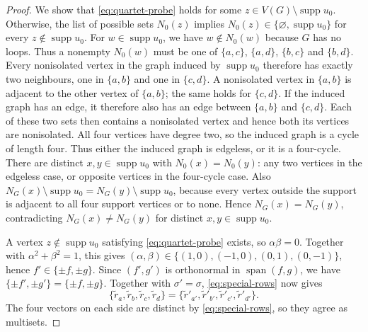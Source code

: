 \documentclass[11pt,a4paper]{article}
\theoremstyle{plain}
\theoremstyle{definition}
\DeclareMathOperator{\supp}{supp}
\DeclareMathOperator{\spn}{span}
\begin{document}
\begin{proof}
  We show that \cref{eq:quartet-probe} holds for some
  $z\in V(G)\setminus\supp u_0$. Otherwise, the list of
  possible sets $N_0(z)$ implies
  $N_0(z)\in\{\varnothing,\supp u_0\}$ for every
  $z\notin\supp u_0$.
  For $w\in\supp u_0$, we have $w\notin N_0(w)$ because $G$ has no loops.
  Thus a nonempty $N_0(w)$ must be one of
  $\{a,c\}$, $\{a,d\}$, $\{b,c\}$ and $\{b,d\}$.
  Every nonisolated vertex in the graph induced by $\supp u_0$
  therefore has exactly two neighbours, one in $\{a,b\}$ and one in
  $\{c,d\}$. A nonisolated vertex in $\{a,b\}$ is adjacent to the
  other vertex of $\{a,b\}$; the same holds for $\{c,d\}$.
  If the induced graph has an edge, it therefore also has an edge
  between $\{a,b\}$ and $\{c,d\}$.
  Each of these two sets then contains a nonisolated vertex and hence
  both its vertices are nonisolated. All four vertices have degree two,
  so the induced graph is a cycle of length four.
  Thus either the induced graph is edgeless, or it is a four-cycle.
  There are distinct $x,y\in\supp u_0$ with $N_0(x)=N_0(y)$:
  any two vertices in the edgeless case, or opposite vertices in the
  four-cycle case. Also
  $N_G(x)\setminus\supp u_0=N_G(y)\setminus\supp u_0$, because every
  vertex outside the support is adjacent to all four support vertices
  or to none. Hence $N_G(x)=N_G(y)$, contradicting
  $N_G(x)\ne N_G(y)$ for distinct $x,y\in\supp u_0$.

  A vertex $z\notin\supp u_0$ satisfying \cref{eq:quartet-probe}
  exists, so $\alpha\beta=0$. Together with $\alpha^2+\beta^2=1$,
  this gives $(\alpha,\beta)\in\{(1,0),(-1,0),(0,1),(0,-1)\}$,
  hence $f'\in\{\pm f,\pm g\}$. Since $(f',g')$ is orthonormal in
  $\spn(f,g)$, we have $\{\pm f',\pm g'\}=\{\pm f,\pm g\}$.
  Together with $\sigma'=\sigma$, \cref{eq:special-rows} now gives
  \begin{equation}\label{eq:quartet-row-equality}
    \{\tilde{r}_a,\tilde{r}_b,\tilde{r}_c,\tilde{r}_d\}
    =\{\tilde{r}'_{a'},\tilde{r}'_{b'},\tilde{r}'_{c'},\tilde{r}'_{d'}\}.
  \end{equation}
  The four vectors on each side are distinct by \cref{eq:special-rows},
  so they agree as multisets.
\end{proof}
\end{document}
